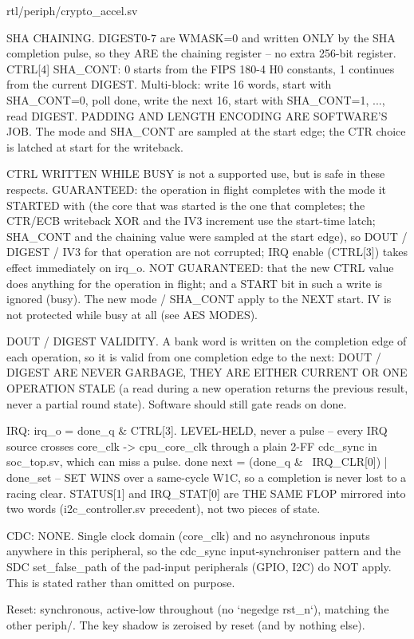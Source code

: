 \begin{relocated}{rtl/periph/crypto_accel.sv}
\begin{textblock}
SHA CHAINING. DIGEST0-7 are WMASK=0 and written ONLY by the SHA completion pulse, so they ARE the
chaining register -- no extra 256-bit register. CTRL[4] SHA_CONT: 0 starts from the FIPS 180-4
H0 constants, 1 continues from the current DIGEST. Multi-block: write 16 words, start with
SHA_CONT=0, poll done, write the next 16, start with SHA_CONT=1, ..., read DIGEST. PADDING AND
LENGTH ENCODING ARE SOFTWARE'S JOB. The mode and SHA_CONT are sampled at the start edge; the CTR
choice is latched at start for the writeback.

CTRL WRITTEN WHILE BUSY is not a supported use, but is safe in these respects. GUARANTEED: the
operation in flight completes with the mode it STARTED with (the core that was started is the
one that completes; the CTR/ECB writeback XOR and the IV3 increment use the start-time latch;
SHA_CONT and the chaining value were sampled at the start edge), so DOUT / DIGEST / IV3 for that
operation are not corrupted; IRQ enable (CTRL[3]) takes effect immediately on irq_o. NOT
GUARANTEED: that the new CTRL value does anything for the operation in flight; and a START bit
in such a write is ignored (busy). The new mode / SHA_CONT apply to the NEXT start. IV is not
protected while busy at all (see AES MODES).

DOUT / DIGEST VALIDITY. A bank word is written on the completion edge of each operation, so it is
valid from one completion edge to the next: DOUT / DIGEST ARE NEVER GARBAGE, THEY ARE EITHER
CURRENT OR ONE OPERATION STALE (a read during a new operation returns the previous result, never
a partial round state). Software should still gate reads on done.

IRQ: irq_o = done_q & CTRL[3]. LEVEL-HELD, never a pulse -- every IRQ source crosses
core_clk -> cpu_core_clk through a plain 2-FF cdc_sync in soc_top.sv, which can miss a pulse.
  done next = (done_q & ~IRQ_CLR[0]) | done_set   -- SET WINS over a same-cycle W1C, so a
  completion is never lost to a racing clear. STATUS[1] and IRQ_STAT[0] are THE SAME FLOP mirrored
  into two words (i2c_controller.sv precedent), not two pieces of state.

CDC: NONE. Single clock domain (core_clk) and no asynchronous inputs anywhere in this peripheral,
so the cdc_sync input-synchroniser pattern and the SDC set_false_path of the pad-input
peripherals (GPIO, I2C) do NOT apply. This is stated rather than omitted on purpose.

Reset: synchronous, active-low throughout (no `negedge rst_n`), matching the other periph/. The
key shadow is zeroised by reset (and by nothing else).


\end{textblock}
\end{relocated}
